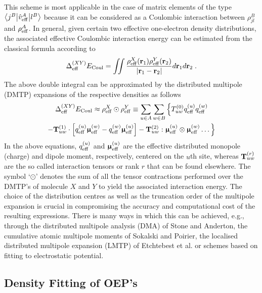 This scheme is most applicable in the case of matrix elements of the type
$
 \bigl\langle {j^B} \bigl\lvert {\hat{v}_{\rm eff}^A} \bigl\lvert {l^B} \bigr\rangle
$
because it can be considered as a Coulombic interaction between $\rho^B_{jl}$
and $\rho^A_{\rm eff}$. 
In general, given certain two effective one\hyp{}electron density distributions,
the associated effective Coulombic interaction energy can be estimated from the classical formula
according to
%
\begin{equation}
 \Delta^{(XY)}_{\rm eff} E_{\rm Coul} = \iint \frac{\rho_{\rm eff}^X({\bf r}_1) \rho_{\rm eff}^Y({\bf r}_2)}
 {\vert {\bf r}_1 - {\bf r}_2 \vert} 
d{\bf r}_1 d{\bf r}_2 \;.
\end{equation}
%
The above double integral can be approximated by the
distributed multipole (DMTP)
expansions of the respective densities as follows
%
\begin{multline}
  \Delta^{(XY)}_{\rm eff} E_{\rm Coul} \approx
 \rho_{\rm eff}^X \odot \rho_{\rm eff}^Y \equiv
 \sum_{u\in A} \sum_{w\in B} \Big\{ 
 T^{(0)}_{uw}
 q_{\rm eff}^{(u)}  q_{\rm eff}^{(w)} \\
 - {\bf T}^{(1)}_{uw} \cdot 
   \left[ q_{\rm eff}^{(u)} {\bm{\upmu}}_{\rm eff}^{(w)} - q_{\rm eff}^{(w)} {\bm{\upmu}}_{\rm eff}^{(u)} \right]
 - {\bf T}^{(2)}_{uw} : 
  {\bm{\upmu}}_{\rm eff}^{(u)}  \otimes {\bm{\upmu}}_{\rm eff}^{(w)} 
 \ldots
 \Big\}
\end{multline}
%
In the above equations, $q_{\rm eff}^{(u)}$ and ${\bm{\upmu}}^{(u)}_{\rm eff}$ 
are the effective distributed monopole (charge)
and dipole moment, respectively, centered on the $u$th site, 
whereas ${{\bf T}^{(r)}_{uw}}$ are the so called interaction tensors or rank $r$ 
that can be found elsewhere.
The symbol `$\odot$' denotes the sum of all the tensor contractions
performed over the DMTP's of molecule $X$ and $Y$ to yield the associated interaction energy.
The choice of the distribution centres as well as the truncation order of the multipole expansion
is crucial in compromising the accuracy and computational cost of the resulting expressions.
There is many ways in which this can be achieved, e.g., through the distributed multipole analysis (DMA)
of Stone and Anderton, %
the cumulative atomic multipole moments of Sokalski and Poirier, %
the localised distributed multipole expansion (LMTP) of Etchtebest et al. %
or schemes based on fitting to electrostatic potential.

\subsection{\label{s.3344}Density Fitting of OEP's}

